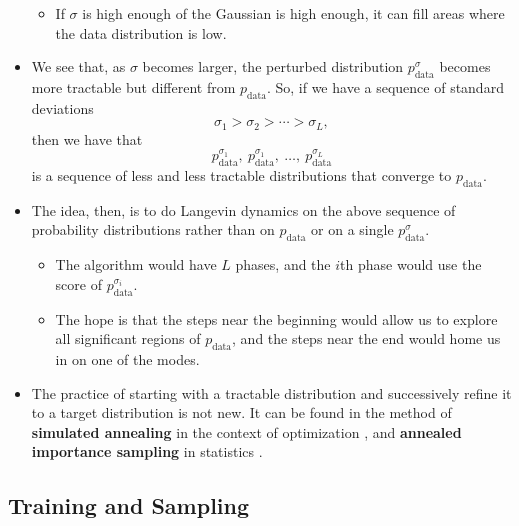 \documentclass[10pt]{article}
\newcommand{\mrm}[1]{\mathrm{#1}}
\begin{document}
\begin{itemize}
\begin{itemize}
    \item If $\sigma$ is high enough of the Gaussian is high enough, it can fill areas where the data distribution is low.
  \end{itemize}

  \item We see that, as $\sigma$ becomes larger, the perturbed distribution $p^\sigma_{\mrm{data}}$ becomes more tractable but different from $p_{\mrm{data}}$. So, if we have a sequence of standard deviations $$\sigma_1 > \sigma_2 > \dotsb > \sigma_L,$$ then we have that $$p_{\mrm{data}}^{\sigma_1},\ p_{\mrm{data}}^{\sigma_1},\ \dotsc,\ p_{\mrm{data}}^{\sigma_L}$$ is a sequence of less and less tractable distributions that converge to $p_{\mrm{data}}$.
  
  \item The idea, then, is to do Langevin dynamics on the above sequence of probability distributions rather than on $p_{\mrm{data}}$ or on a single $p_{\mrm{data}}^\sigma.$
  \begin{itemize}
    \item The algorithm would have $L$ phases, and the $i$th phase would use the score of $p_{\mrm{data}}^{\sigma_i}$. 
    
    \item The hope is that the steps near the beginning would allow us to explore all significant regions of $p_{\mrm{data}}$, and the steps near the end would home us in on one of the modes.
  \end{itemize}

  \item The practice of starting with a tractable distribution and successively refine it to a target distribution is not new. It can be found in the method of {\bf simulated annealing} in the context of optimization \cite{Kirkpatrick:1983}, and {\bf annealed importance sampling} in statistics \cite{Neal:1998}.
\end{itemize}
  
\subsection{Training and Sampling} \label{sec:song-2019-training-and-sampling}
\end{document}
